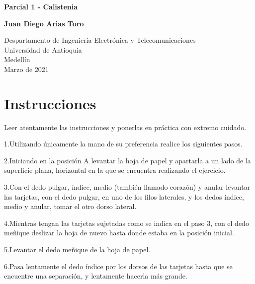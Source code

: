 \documentclass{article}
\begin{document}
\begin{titlepage}
    \begin{center}
        \vspace*{1cm}
            
        \Huge
        \textbf{Parcial 1 - Calistenia}
            
        \vspace{0.5cm}
        \LARGE
        
            
        \vspace{1.5cm}
            
        \textbf{Juan Diego Arias Toro}
            
        \vfill
            
        \vspace{0.8cm}
            
        \Large
        Despartamento de Ingeniería Electrónica y Telecomunicaciones\\
        Universidad de Antioquia\\
        Medellín\\
        Marzo de 2021
            
    \end{center}
\end{titlepage}

\tableofcontents
\newpage
\section{Instrucciones}\label{intro}
Leer atentamente las instrucciones y ponerlas en práctica con extremo cuidado.

1.Utilizando únicamente la mano de su preferencia realice los siguientes pasos.

2.Iniciando en la posición A levantar la hoja de papel y apartarla a un lado de la superficie plana, horizontal en la que se encuentra realizando el ejercicio.

3.Con el dedo pulgar, índice, medio (también llamado corazón) y anular levantar las tarjetas, con el dedo pulgar, en uno de los filos laterales, y los dedos índice, medio y anular, tomar el otro dorso lateral.

4.Mientras tengan las tarjetas sujetadas como se indica en el paso 3, con el dedo meñique deslizar la hoja de nuevo hasta donde estaba  en la posición inicial.

5.Levantar el dedo meñique de la hoja de papel.

6.Pasa lentamente el dedo índice por los dorsos de las tarjetas hasta que se encuentre una separación, y  lentamente hacerla más grande.
\end{document}
